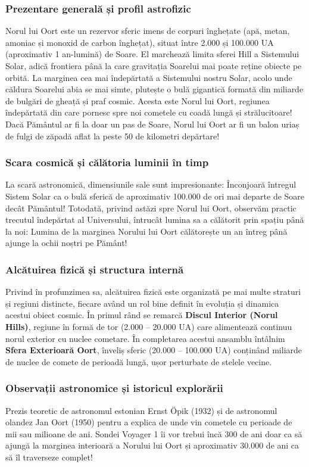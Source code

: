 \subsubsection*{Prezentare generală și profil astrofizic}
Norul lui Oort este un rezervor sferic imens de corpuri înghețate (apă, metan, amoniac și monoxid de carbon înghețat), situat între 2.000 și 100.000 UA (aproximativ 1 an-lumină) de Soare. El marchează limita sferei Hill a Sistemului Solar, adică frontiera până la care gravitația Soarelui mai poate reține obiecte pe orbită. La marginea cea mai îndepărtată a Sistemului nostru Solar, acolo unde căldura Soarelui abia se mai simte, plutește o bulă gigantică formată din miliarde de bulgări de gheață și praf cosmic. Acesta este Norul lui Oort, regiunea îndepărtată din care pornesc spre noi cometele cu coadă lungă și strălucitoare! Dacă Pământul ar fi la doar un pas de Soare, Norul lui Oort ar fi un balon uriaș de fulgi de zăpadă aflat la peste 50 de kilometri depărtare!

\subsubsection*{Scara cosmică și călătoria luminii în timp}
La scară astronomică, dimensiunile sale sunt impresionante: Înconjoară întregul Sistem Solar ca o bulă sferică de aproximativ 100.000 de ori mai departe de Soare decât Pământul! Totodată, privind astăzi spre Norul lui Oort, observăm practic trecutul îndepărtat al Universului, întrucât lumina sa a călătorit prin spațiu până la noi: Lumina de la marginea Norului lui Oort călătorește un an întreg până ajunge la ochii noștri pe Pământ!

\subsubsection*{Alcătuirea fizică și structura internă}
Privind în profunzimea sa, alcătuirea fizică este organizată pe mai multe straturi și regiuni distincte, fiecare având un rol bine definit în evoluția și dinamica acestui obiect cosmic. În primul rând se remarcă \textbf{Discul Interior (Norul Hills)}, regiune în formă de tor (2.000 -- 20.000 UA) care alimentează continuu norul exterior cu nuclee cometare. În completarea acestui ansamblu întâlnim \textbf{Sfera Exterioară Oort}, înveliș sferic (20.000 -- 100.000 UA) conținând miliarde de nuclee de comete de perioadă lungă, ușor perturbate de stelele vecine.

\subsubsection*{Observații astronomice și istoricul explorării}
Prezis teoretic de astronomul estonian Ernst Öpik (1932) și de astronomul olandez Jan Oort (1950) pentru a explica de unde vin cometele cu perioade de mii sau milioane de ani. Sondei Voyager 1 îi vor trebui încă 300 de ani doar ca să ajungă la marginea interioară a Norului lui Oort și aproximativ 30.000 de ani ca să îl traverseze complet!

